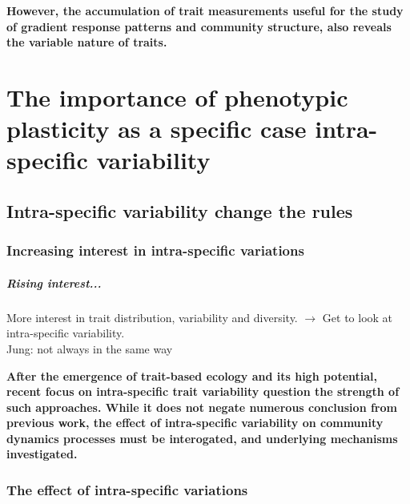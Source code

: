 \textbf{However, the accumulation of trait measurements useful for the study of gradient response patterns and community structure, also reveals the variable nature of traits.}



\chapter{The importance of phenotypic plasticity as a specific case intra-specific variability}

\section{Intra-specific variability change the rules}

\subsection{Increasing interest in intra-specific variations}
\paragraph{Rising interest...}
More interest in trait distribution, variability and diversity. $\rightarrow$ Get to look at intra-specific variability.\\
Jung: not always in the same way \parencite{jung_intraspecific_2014}\\

\parencite{poorter_biomass_2012}
\parencite{poorter_leaf_2006}
\parencite{kichenin_contrasting_2013}
\parencite{siefert_global_2015}
\parencite{albert_importance_2012}
\parencite{violle_return_2012}

\textbf{After the emergence of trait-based ecology and its high potential, recent focus on intra-specific trait variability question the strength of such approaches. While it does not negate numerous conclusion from previous work, the effect of intra-specific variability on community dynamics processes must be interogated, and underlying mechanisms investigated.}

\subsection{The effect of intra-specific variations}

